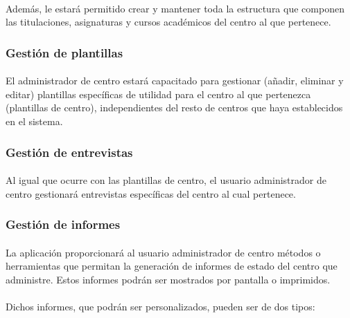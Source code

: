       \paragraph{}Además, le estará permitido crear y mantener toda la
      estructura que componen las titulaciones, asignaturas y cursos
      académicos del centro al que pertenece.

      \subsubsection{Gestión de plantillas}

      \paragraph{}El administrador de centro estará capacitado para gestionar
      (añadir, eliminar y editar) plantillas específicas de utilidad para el
      centro al que pertenezca (plantillas de centro), independientes del resto
      de centros que haya establecidos en el sistema.

      \subsubsection{Gestión de entrevistas}

      \paragraph{}Al igual que ocurre con las plantillas de centro, el usuario
      administrador de centro gestionará entrevistas específicas del centro
      al cual pertenece.

      \subsubsection{Gestión de informes}

      \paragraph{}La aplicación proporcionará al usuario administrador de centro
      métodos o herramientas que permitan la generación de informes de estado
      del centro que administre. Estos informes podrán ser mostrados por
      pantalla o imprimidos.

      \paragraph{}Dichos informes, que podrán ser personalizados, pueden ser
      de dos tipos:


